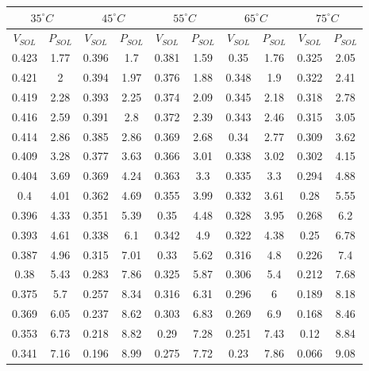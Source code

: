 \documentclass[12pt]{article}
\begin{document}
\begin{center}
 \begin{tabular}{|| c c | c c | c c | c c | c c ||} 
 \hline
 \multicolumn{2}{||c|}{\(35^{\circ}C\)} & \multicolumn{2}{c|}{\(45^{\circ}C\)} & \multicolumn{2}{c||}{\(55^{\circ}C\)} & \multicolumn{2}{c||}{\(65^{\circ}C\)} & \multicolumn{2}{c||}{\(75^{\circ}C\)}\\
 \hline
 \hline
 \( V_{SOL} \) & \( P_{SOL} \) & \( V_{SOL} \) & \( P_{SOL} \) & \( V_{SOL} \) & \( P_{SOL} \) & \( V_{SOL} \) & \( P_{SOL} \) & \( V_{SOL} \) & \( P_{SOL} \) \\ [0.25ex] 
 \hline\hline
 \hline 
0.423 & 1.77 & 0.396 & 1.7 & 0.381 & 1.59 & 0.35 & 1.76 & 0.325 & 2.05 \\ \hline 
0.421 & 2 & 0.394 & 1.97 & 0.376 & 1.88 & 0.348 & 1.9 & 0.322 & 2.41 \\ \hline 
0.419 & 2.28 & 0.393 & 2.25 & 0.374 & 2.09 & 0.345 & 2.18 & 0.318 & 2.78 \\ \hline 
0.416 & 2.59 & 0.391 & 2.8 & 0.372 & 2.39 & 0.343 & 2.46 & 0.315 & 3.05 \\ \hline 
0.414 & 2.86 & 0.385 & 2.86 & 0.369 & 2.68 & 0.34 & 2.77 & 0.309 & 3.62 \\ \hline 
0.409 & 3.28 & 0.377 & 3.63 & 0.366 & 3.01 & 0.338 & 3.02 & 0.302 & 4.15 \\ \hline 
0.404 & 3.69 & 0.369 & 4.24 & 0.363 & 3.3 & 0.335 & 3.3 & 0.294 & 4.88 \\ \hline 
0.4 & 4.01 & 0.362 & 4.69 & 0.355 & 3.99 & 0.332 & 3.61 & 0.28 & 5.55 \\ \hline 
0.396 & 4.33 & 0.351 & 5.39 & 0.35 & 4.48 & 0.328 & 3.95 & 0.268 & 6.2 \\ \hline 
0.393 & 4.61 & 0.338 & 6.1 & 0.342 & 4.9 & 0.322 & 4.38 & 0.25 & 6.78 \\ \hline 
0.387 & 4.96 & 0.315 & 7.01 & 0.33 & 5.62 & 0.316 & 4.8 & 0.226 & 7.4 \\ \hline 
0.38 & 5.43 & 0.283 & 7.86 & 0.325 & 5.87 & 0.306 & 5.4 & 0.212 & 7.68 \\ \hline 
0.375 & 5.7 & 0.257 & 8.34 & 0.316 & 6.31 & 0.296 & 6 & 0.189 & 8.18 \\ \hline 
0.369 & 6.05 & 0.237 & 8.62 & 0.303 & 6.83 & 0.269 & 6.9 & 0.168 & 8.46 \\ \hline 
0.353 & 6.73 & 0.218 & 8.82 & 0.29 & 7.28 & 0.251 & 7.43 & 0.12 & 8.84 \\ \hline 
0.341 & 7.16 & 0.196 & 8.99 & 0.275 & 7.72 & 0.23 & 7.86 & 0.066 & 9.08 \\ \hline 

\end{tabular}
\end{center}
\end{document}
